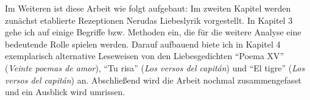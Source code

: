 Im Weiteren ist diese Arbeit wie folgt aufgebaut:
Im zweiten Kapitel werden zunächst etablierte Rezeptionen Nerudas Liebeslyrik vorgestellt.
In Kapitel 3 gehe ich auf einige Begriffe bzw. Methoden ein, die für die weitere Analyse eine bedeutende Rolle spielen werden.
Darauf aufbauend biete ich in Kapitel 4 exemplarisch alternative Leseweisen von den Liebesgedichten ``Poema XV'' (\textit{Veinte poemas de amor}), ``Tu risa'' (\textit{Los versos del capitán}) und ``El tigre'' (\textit{Los versos del capitán}) an.
Abschließend wird die Arbeit nochmal zusammengefasst und ein Ausblick wird umrissen.

